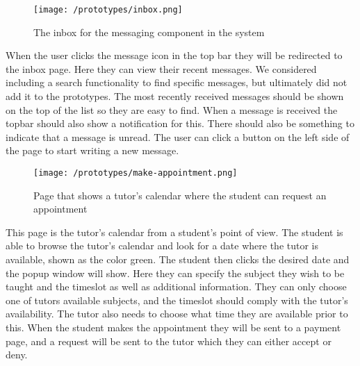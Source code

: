  \begin{figure}[H]
    \texttt{[image: /prototypes/inbox.png]}
     \caption{The inbox for the messaging component in the system}
     \label{fig:inbox}
 \end{figure}
When the user clicks the message icon in the top bar they will be redirected to the inbox page. Here they can view their recent messages. 
We considered including a search functionality to find specific messages, but ultimately did not add it to the prototypes. 
The most recently received messages should be shown on the top of the list so they are easy to find. 
When a message is received the topbar should also show a notification for this. 
There should also be something to indicate that a message is unread. 
The user can click a button on the left side of the page to start writing a new message. 


 \begin{figure}[H]
    \texttt{[image: /prototypes/make-appointment.png]}
     \caption{Page that shows a tutor's calendar where the student can request an appointment}
     \label{fig:make-appointment}
 \end{figure}
 This page is the tutor's calendar from a student's point of view. 
 The student is able to browse the tutor's calendar and look for a date where the tutor is available, shown as the color green. 
 The student then clicks the desired date and the popup window will show. 
 Here they can specify the subject they wish to be taught and the timeslot as well as additional information. 
 They can only choose one of tutors available subjects, and the timeslot should comply with the tutor's availability. 
 The tutor also needs to choose what time they are available prior to this.
 When the student makes the appointment they will be sent to a payment page, and a request will be sent to the tutor which they can either accept or deny. 


